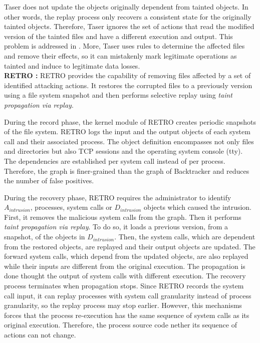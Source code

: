  
Taser does not update the objects originally dependent from tainted objects. In other words, the replay process only recovers a consistent state for the originally tainted objects. Therefore, Taser ignores the set of actions that read the modified version of the tainted files and have a different execution and output. This problem is addressed in \cite{Shafique2006}. More, Taser uses rules to determine the affected files and remove their effects, so it can mistakenly mark legitimate operations as tainted and induce to legitimate data losses.\\



\textbf{RETRO \cite{retro}:} RETRO provides the capability of removing files affected by a set of identified attacking actions. It restores the corrupted files to a previously version using a file system snapshot and then performs selective replay using \textit{taint propagation via replay}. 

During the record phase, the kernel module of RETRO creates periodic snapshots of the file system. RETRO logs the input and the output objects of each system call and their associated process. The object definition encompasses not only files and directories but also TCP sessions and the operating system console (tty). The dependencies are established per system call instead of per process. Therefore, the graph is finer-grained than the graph of Backtracker \cite{backtracker} and reduces the number of false positives.

During the recovery phase, RETRO requires the administrator to identify $A_{intrusion}$, processes, system calls or $D_{intrusion}$ objects which caused the intrusion. First, it removes the malicious system calls from the graph. Then it performs \textit{taint propagation via replay}. To do so, it loads a previous version, from a snapshot, of the objects in $D_{intrusion}$. Then, the system calls, which are dependent from the restored objects, are replayed and their output objects are updated. The forward system calls, which depend from the updated objects, are also replayed while their inputs are different from the original execution. The propagation is done thought the output of system calls with different execution. The recovery process terminates when propagation stops. Since RETRO records the system call input, it can replay processes with system call granularity instead of process granularity, so the replay process may stop earlier. However, this mechanisms forces that the process re-execution has the same sequence of system calls as its original execution. Therefore, the process source code nether its sequence of actions can not change. 

